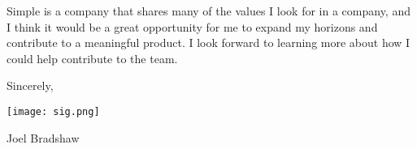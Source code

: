 \documentclass[letterpaper,12pt]{article}
\begin{document}
\begin{paracol}{2}
Simple is a company that shares many of the values I look for in a company, and I think it would be a great
opportunity for me to expand my horizons and contribute to a meaningful product. I look forward to learning
more about how I could help contribute to the team.

Sincerely,

\texttt{[image: sig.png]}

Joel Bradshaw


\flushpage
\end{paracol}
\end{document}
